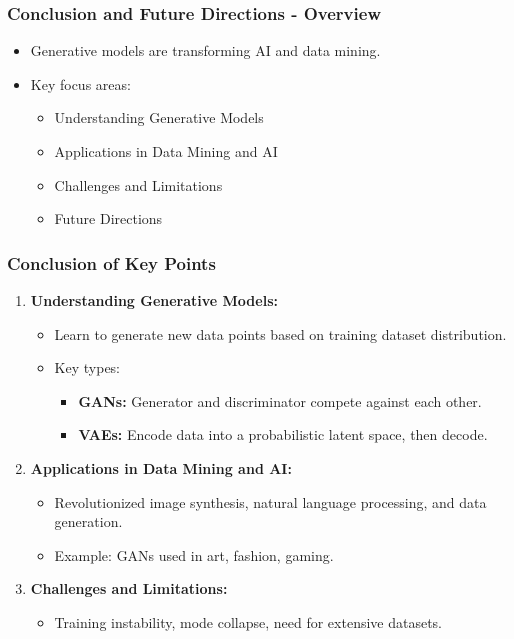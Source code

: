 \documentclass[aspectratio=169]{beamer}
\begin{document}
\begin{frame}[fragile]
    \frametitle{Conclusion and Future Directions - Overview}
    \begin{itemize}
        \item Generative models are transforming AI and data mining.
        \item Key focus areas: 
        \begin{itemize}
            \item Understanding Generative Models
            \item Applications in Data Mining and AI
            \item Challenges and Limitations
            \item Future Directions
        \end{itemize}
    \end{itemize}
\end{frame}

\begin{frame}[fragile]
    \frametitle{Conclusion of Key Points}
    \begin{enumerate}
        \item \textbf{Understanding Generative Models:}
        \begin{itemize}
            \item Learn to generate new data points based on training dataset distribution.
            \item Key types:
            \begin{itemize}
                \item \textbf{GANs:} Generator and discriminator compete against each other.
                \item \textbf{VAEs:} Encode data into a probabilistic latent space, then decode.
            \end{itemize}
        \end{itemize}
        \item \textbf{Applications in Data Mining and AI:}
        \begin{itemize}
            \item Revolutionized image synthesis, natural language processing, and data generation.
            \item Example: GANs used in art, fashion, gaming.
        \end{itemize}
        \item \textbf{Challenges and Limitations:}
        \begin{itemize}
            \item Training instability, mode collapse, need for extensive datasets.
        \end{itemize}
    \end{enumerate}
\end{frame}
\end{document}
